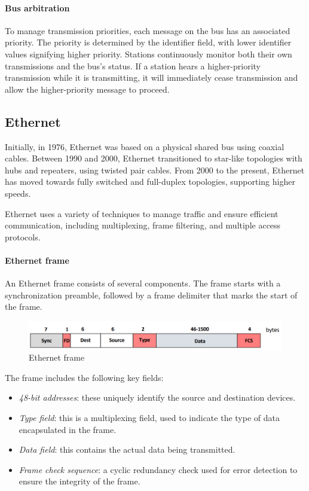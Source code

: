 \paragraph*{Bus arbitration}
To manage transmission priorities, each message on the bus has an associated priority. 
The priority is determined by the identifier field, with lower identifier values signifying higher priority. 
Stations continuously monitor both their own transmissions and the bus's status. 
If a station hears a higher-priority transmission while it is transmitting, it will immediately cease transmission and allow the higher-priority message to proceed.

\subsection{Ethernet}
Initially, in 1976, Ethernet was based on a physical shared bus using coaxial cables.
Between 1990 and 2000, Ethernet transitioned to star-like topologies with hubs and repeaters, using twisted pair cables.
From 2000 to the present, Ethernet has moved towards fully switched and full-duplex topologies, supporting higher speeds.

Ethernet uses a variety of techniques to manage traffic and ensure efficient communication, including multiplexing, frame filtering, and multiple access protocols.

\paragraph*{Ethernet frame}
An Ethernet frame consists of several components. 
The frame starts with a synchronization preamble, followed by a frame delimiter that marks the start of the frame.
\begin{figure}[H]
    \centering
    \includegraphics[width=0.5\linewidth]{images/eth.png}
    \caption{Ethernet frame}
\end{figure}
\noindent The frame includes the following key fields:
\begin{itemize}
    \item \textit{48-bit addresses}: these uniquely identify the source and destination devices.
    \item \textit{Type field}: this is a multiplexing field, used to indicate the type of data encapsulated in the frame.
    \item \textit{Data field}: this contains the actual data being transmitted.
    \item \textit{Frame check sequence}: a cyclic redundancy check used for error detection to ensure the integrity of the frame.
\end{itemize}

